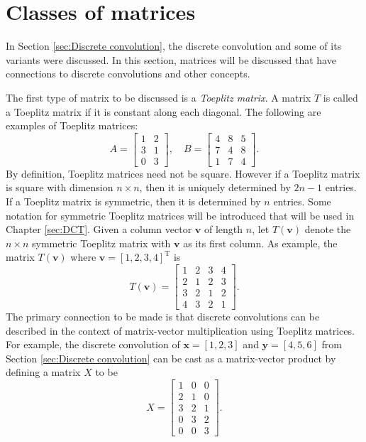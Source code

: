 \documentclass[12pt,notitlepage]{report}
\newcommand{\trans}{\mathrm{T}}	%
\begin{document}
\section{Classes of matrices} \label{sec:Classes of matrices}
In Section \ref{sec:Discrete convolution}, the discrete convolution and some of its variants were discussed. In this section, matrices will be discussed that have connections to discrete convolutions and other concepts. \par 
The first type of matrix to be discussed is a \textit{Toeplitz matrix}. A matrix $T$ is called a Toeplitz matrix if it is constant along each diagonal. The following are examples of Toeplitz matrices:
\[A = \begin{bmatrix}
1 & 2 \\
3 & 1 \\
0 & 3
\end{bmatrix}, \quad 
B = \begin{bmatrix}
4 & 8 & 5 \\
7 & 4 & 8 \\
1 & 7 & 4
\end{bmatrix}.\]
By definition, Toeplitz matrices need not be square. However if a Toeplitz matrix is square with dimension $n \times n$, then it is uniquely determined by $2n-1$ entries. If a Toeplitz matrix is symmetric, then it is determined by $n$ entries. Some notation for symmetric Toeplitz matrices will be introduced that will be used in Chapter \ref{sec:DCT}. Given a column vector $\mathbf{v}$ of length $n$, let $T(\mathbf{v})$ denote the $n \times n$ symmetric Toeplitz matrix with $\mathbf{v}$ as its first column. As example, the matrix $T(\mathbf{v})$ where $\mathbf{v} = [1,2,3,4]^\trans$ is
\[T(\mathbf{v}) = \begin{bmatrix}
1 & 2 & 3 & 4 \\
2 & 1 & 2 & 3 \\
3 & 2 & 1 & 2 \\
4 & 3 & 2 & 1 
\end{bmatrix}.\] 
The primary connection to be made is that discrete convolutions can be described in the context of matrix-vector multiplication using Toeplitz matrices. For example, the discrete convolution of $\mathbf{x} = [1,2,3]$ and $\mathbf{y} = [4,5,6]$ from Section \ref{sec:Discrete convolution} can be cast as a matrix-vector product by defining a matrix $X$ to be
\[X = \begin{bmatrix}
1 & 0 & 0  \\
2 & 1 & 0 \\
3 & 2 & 1 \\
0 & 3 & 2 \\
0 & 0 & 3 
\end{bmatrix}.\]
\end{document}
